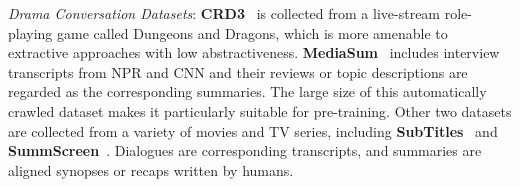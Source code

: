  
\textit{Drama Conversation Datasets}: \textbf{CRD3}~\cite{rameshkumar2020storytelling} is collected from a live-stream role-playing game called Dungeons and Dragons, which is more amenable to extractive approaches with low abstractiveness.
 \textbf{MediaSum}~\cite{zhu2021mediasum} includes interview transcripts from 
NPR and CNN and their reviews or topic descriptions are regarded as the 
corresponding summaries. The large size of this automatically crawled 
dataset makes it particularly suitable for pre-training. %
Other two datasets are collected from a variety of movies and TV series, 
including \textbf{SubTitles}~\cite{malykh2020sumtitles} and 
\textbf{SummScreen}~\cite{chen2021summscreen}. Dialogues are corresponding 
transcripts, and summaries are aligned synopses or recaps 
written by humans.
 
